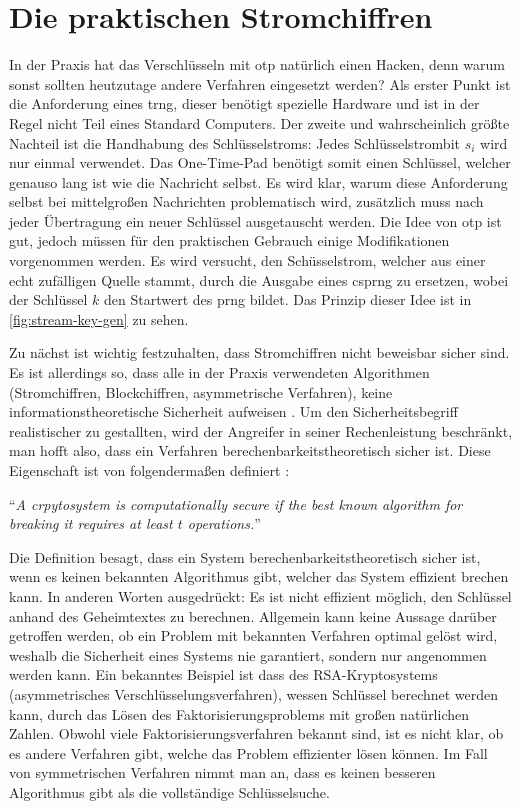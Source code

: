\section{Die praktischen Stromchiffren}
In der Praxis hat das Verschlüsseln mit \ac{otp} natürlich einen Hacken, denn warum sonst
sollten heutzutage andere Verfahren eingesetzt werden?
Als erster Punkt ist die Anforderung eines \ac{trng}, dieser benötigt spezielle
Hardware und ist in der Regel nicht Teil eines Standard Computers.
Der zweite und wahrscheinlich größte Nachteil ist die Handhabung des Schlüsselstroms:
Jedes Schlüsselstrombit $s_i$ wird nur einmal verwendet.
Das One-Time-Pad benötigt somit einen Schlüssel, welcher genauso lang ist
wie die Nachricht selbst. Es wird klar, warum diese Anforderung
selbst bei mittelgroßen Nachrichten problematisch wird, zusätzlich muss nach jeder
Übertragung ein neuer Schlüssel ausgetauscht werden. Die Idee von \ac{otp} ist gut,
jedoch müssen für den praktischen Gebrauch einige Modifikationen vorgenommen werden.
Es wird versucht, den Schüsselstrom, welcher aus einer echt zufälligen Quelle stammt,
durch die Ausgabe eines \ac{csprng} zu ersetzen, wobei der Schlüssel $k$
den Startwert des \ac{prng} bildet. Das Prinzip dieser Idee ist in
\autoref{fig:stream-key-gen} zu sehen.



\noindent
Zu nächst ist wichtig festzuhalten, dass
Stromchiffren nicht beweisbar sicher sind. Es ist allerdings so, dass alle in der
Praxis verwendeten Algorithmen (Stromchiffren, Blockchiffren, asymmetrische
Verfahren), keine informationstheoretische Sicherheit aufweisen \parencite[38]{BOOK:crypto}.
Um den Sicherheitsbegriff realistischer zu gestallten, wird der Angreifer in seiner
Rechenleistung beschränkt, man hofft also, dass ein Verfahren berechenbarkeitstheoretisch
sicher ist. Diese Eigenschaft ist von \citeauthor{BOOK:crypto}
folgendermaßen definiert \parencite*[35]{BOOK:crypto}:

\begin{definition}
  \enquote{\textit{A crpytosystem is computationally secure if the best
      known algorithm for breaking it requires at least $t$ operations.}}
\end{definition}

\noindent
Die Definition besagt, dass ein System berechenbarkeitstheoretisch sicher ist, wenn es
keinen bekannten Algorithmus gibt, welcher das System effizient brechen kann.
In anderen Worten ausgedrückt: Es ist nicht effizient möglich, den
Schlüssel anhand des Geheimtextes zu berechnen. Allgemein kann keine
Aussage darüber getroffen werden, ob ein Problem mit bekannten Verfahren
optimal gelöst wird, weshalb die Sicherheit eines Systems nie garantiert,
sondern nur angenommen werden kann. Ein bekanntes Beispiel ist dass des RSA-Kryptosystems
(asymmetrisches Verschlüsselungsverfahren), wessen Schlüssel
berechnet werden kann, durch das Lösen des Faktorisierungsproblems mit großen
natürlichen Zahlen. Obwohl viele Faktorisierungsverfahren bekannt sind, ist es nicht klar,
ob es andere Verfahren gibt, welche das Problem effizienter lösen können.
Im Fall von symmetrischen Verfahren nimmt man an, dass es keinen besseren Algorithmus
gibt als die vollständige Schlüsselsuche.
